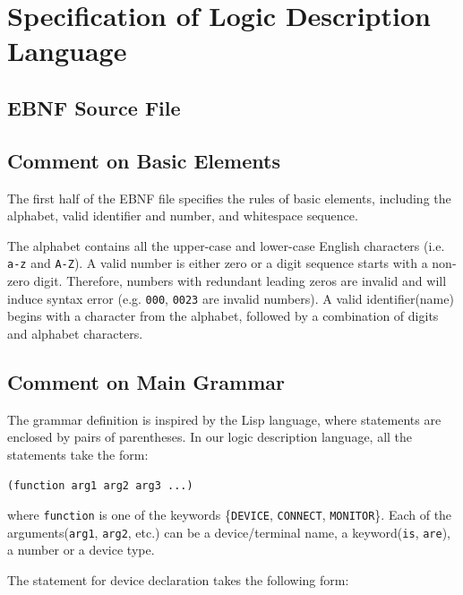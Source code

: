 \documentclass[12pt]{article}
\def\n{\noindent}
\begin{document}
\section{Specification of Logic Description Language}

\subsection{EBNF Source File}



\subsection{Comment on Basic Elements}

The first half of the EBNF file specifies the rules of basic elements, including the
alphabet, valid identifier and number, and whitespace sequence.

\vspace{0.3cm}

\n The alphabet contains all the upper-case and lower-case English characters
(i.e. \texttt{a-z} and \texttt{A-Z}). A valid number is either zero or a digit
sequence starts with a non-zero digit. Therefore, numbers with redundant leading
zeros are invalid and will induce syntax error (e.g. \texttt{000}, \texttt{0023}
are invalid numbers). A valid identifier(name) begins with a character from the
alphabet, followed by a combination of digits and alphabet characters.

\subsection{Comment on Main Grammar}

The grammar definition is inspired by the Lisp language, where statements are
enclosed by pairs of parentheses. In our logic description language, all the
statements take the form:

\vspace{0.3cm}
\n \texttt{(function arg1 arg2 arg3 ...)}
\vspace{0.3cm}

\n where \texttt{function} is one of the keywords \{\texttt{DEVICE},
\texttt{CONNECT}, \texttt{MONITOR}\}. Each of the arguments(\texttt{arg1},
\texttt{arg2}, etc.) can be a device/terminal name, a keyword(\texttt{is},
\texttt{are}), a number or a device type.

\n The statement for device declaration takes the following form:
\end{document}
